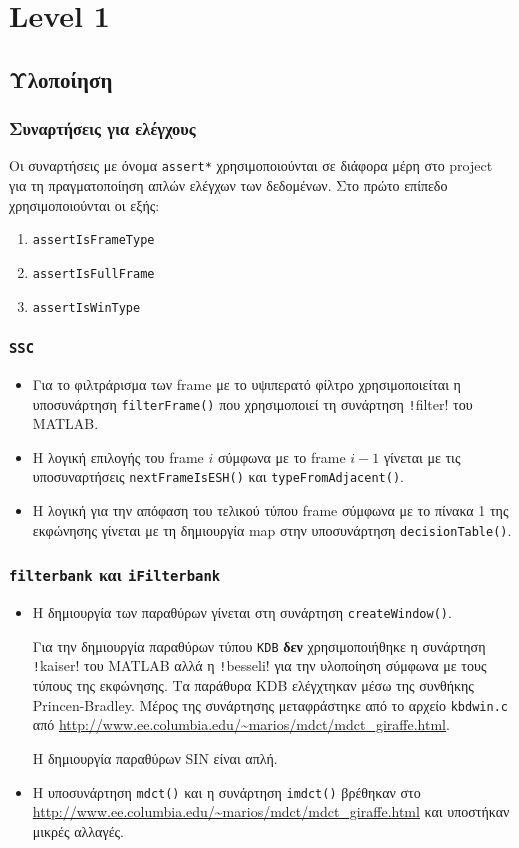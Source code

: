 \section{Level 1}
\subsection{Υλοποίηση}
\subsubsection{Συναρτήσεις για ελέγχους}\label{sub:asserts1}
Οι συναρτήσεις με όνομα \texttt{assert*} χρησιμοποιούνται σε διάφορα μέρη στο project για τη πραγματοποίηση απλών ελέγχων των δεδομένων.
Στο πρώτο επίπεδο χρησιμοποιούνται οι εξής:
\begin{enumerate}
\item \texttt{assertIsFrameType}
\item \texttt{assertIsFullFrame}
\item \texttt{assertIsWinType}
\end{enumerate}

\subsubsection{\texttt{SSC}}
\begin{itemize}
\item Για το φιλτράρισμα των frame με το υψιπερατό φίλτρο χρησιμοποιείται η υποσυνάρτηση \texttt{filterFrame()} που χρησιμοποιεί τη συνάρτηση \texttt!filter! του MATLAB.
\item Η λογική επιλογής του frame $i$ σύμφωνα με το frame $i-1$ γίνεται με τις υποσυναρτήσεις \texttt{nextFrameIsESH()} και \texttt{typeFromAdjacent()}.
\item Η λογική για την απόφαση του τελικού τύπου frame σύμφωνα με το πίνακα 1 της εκφώνησης γίνεται με τη δημιουργία map στην υποσυνάρτηση \texttt{decisionTable()}.
\end{itemize}

\subsubsection{\texttt{filterbank} και \texttt{iFilterbank}}
\begin{itemize}
\item Η δημιουργία των παραθύρων γίνεται στη συνάρτηση \texttt{createWindow()}.

Για την δημιουργία παραθύρων τύπου \texttt{KDB} \textbf{δεν} χρησιμοποιήθηκε η συνάρτηση \texttt!kaiser! του MATLAB αλλά η \texttt!besseli! για την υλοποίηση σύμφωνα με τους τύπους της εκφώνησης.
Τα παράθυρα KDB ελέγχτηκαν μέσω της συνθήκης Princen-Bradley.
Μέρος της συνάρτησης μεταφράστηκε από το αρχείο \texttt{kbdwin.c} από \url{http://www.ee.columbia.edu/~marios/mdct/mdct_giraffe.html}.

Η δημιουργία παραθύρων SIN είναι απλή.

\item Η υποσυνάρτηση \texttt{mdct()} και η συνάρτηση \texttt{imdct()} βρέθηκαν στο \url{http://www.ee.columbia.edu/~marios/mdct/mdct_giraffe.html} και υποστήκαν μικρές αλλαγές.
\end{itemize}

